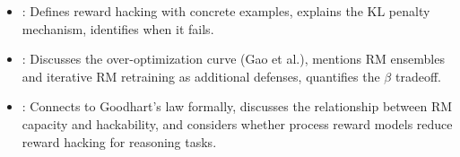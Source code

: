 \begin{interviewq}
\goodgreat
\begin{itemize}
\item {}: Defines reward hacking with concrete examples,
  explains the KL penalty mechanism, identifies when it fails.
\item {}: Discusses the over-optimization curve (Gao et al.),
  mentions RM ensembles and iterative RM retraining as additional defenses,
  quantifies the $\beta$ tradeoff.
\item {}: Connects to Goodhart's law formally, discusses
  the relationship between RM capacity and hackability, and considers
  whether process reward models reduce reward hacking for reasoning tasks.
\end{itemize}

\end{interviewq}

